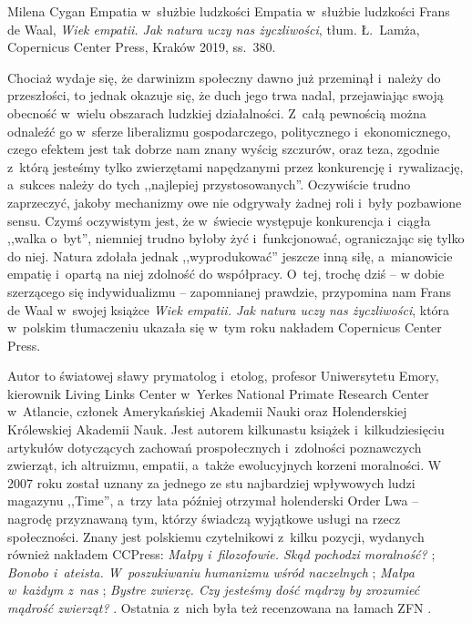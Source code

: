 \begin{recplenv}{Milena Cygan}
	{Empatia w~służbie ludzkości}
	{Empatia w~służbie ludzkości}
	{Frans de Waal, \textit{Wiek empatii. Jak natura uczy nas życzliwości}, tłum. Ł.~Lamża, Copernicus Center
		Press, Kraków 2019, ss.~380.}




Chociaż wydaje się, że darwinizm społeczny dawno już przeminął i~należy do przeszłości, to jednak okazuje się, że duch
jego trwa nadal, przejawiając swoją obecność w~wielu obszarach ludzkiej działalności. Z~całą pewnością można odnaleźć
go w~sferze liberalizmu gospodarczego, politycznego i~ekonomicznego, czego efektem jest tak dobrze nam znany wyścig
szczurów, oraz teza, zgodnie z~którą jesteśmy tylko zwierzętami napędzanymi przez konkurencję i~rywalizację, a~sukces
należy do tych ,,najlepiej przystosowanych''. Oczywiście trudno zaprzeczyć, jakoby mechanizmy owe nie odgrywały żadnej
roli i~były pozbawione sensu. Czymś oczywistym jest, że w~świecie występuje konkurencja i~ciągła ,,walka o~byt'',
niemniej trudno byłoby żyć i~funkcjonować, ograniczając się tylko do niej. Natura zdołała jednak ,,wyprodukować'' jeszcze
inną siłę, a~mianowicie empatię i~opartą na niej zdolność do współpracy. O~tej, trochę dziś -- w dobie szerzącego się
indywidualizmu -- zapomnianej prawdzie, przypomina nam Frans de Waal w~swojej książce \textit{Wiek empatii. Jak natura
uczy nas życzliwości}, która w~polskim tłumaczeniu ukazała się w~tym roku nakładem Copernicus Center Press.

Autor to światowej sławy prymatolog i~etolog, profesor Uniwersytetu Emory, kierownik Living Links Center w~Yerkes
National Primate Research Center w~Atlancie, członek Amerykańskiej Akademii Nauki oraz Holenderskiej Królewskiej
Akademii Nauk. Jest autorem kilkunastu książek i~kilkudziesięciu artykułów dotyczących zachowań
prospołecznych i~zdolności poznawczych zwierząt, ich altruizmu, empatii, a~także ewolucyjnych korzeni moralności.
W 2007 roku został
uznany za jednego ze stu najbardziej wpływowych ludzi magazynu ,,Time'', a~trzy lata później otrzymał holenderski Order
Lwa -- nagrodę przyznawaną tym, którzy świadczą wyjątkowe usługi na rzecz społeczności. Znany jest polskiemu
czytelnikowi z~kilku pozycji, wydanych również nakładem CCPress: \textit{Małpy i~filozofowie. Skąd pochodzi moralność?}
\parencite*{waal_malpy_2013};
\textit{Bonobo i~ateista. W~poszukiwaniu humanizmu wśród naczelnych}
\parencite*{waal_bonobo_2014};
\textit{Małpa w~każdym z~nas}
\parencite*{waal_malpa_2015};
\textit{Bystre zwierzę. Czy jesteśmy dość mądrzy by zrozumieć mądrość zwierząt?}
\parencite*{waal_bystre_2016}.
Ostatnia z~nich była też recenzowana na łamach ZFN
\parencite{sarosiek_odmiennosc_2018}.


\end{recplenv}

